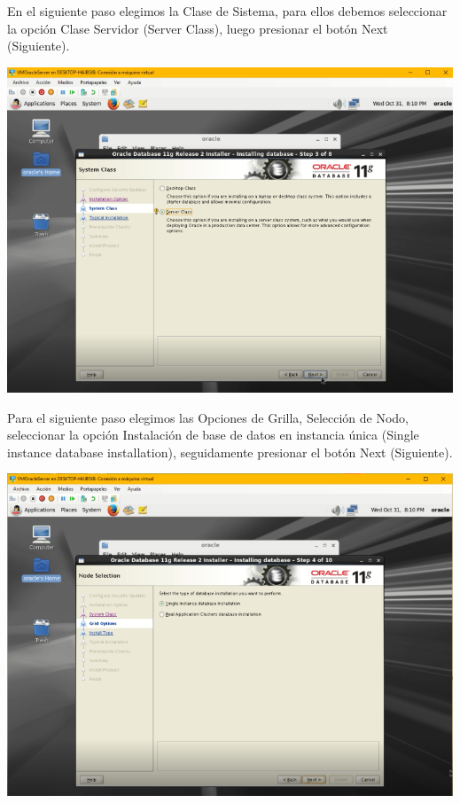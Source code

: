 \vspace{\baselineskip}

En el siguiente paso elegimos la Clase de Sistema, para ellos debemos seleccionar la opción Clase Servidor (Server Class), luego presionar el botón Next (Siguiente).
\begin{center}
	\includegraphics[width=13.3cm]{./Imagenes/73} 
\end{center}

\vspace{\baselineskip}

Para el siguiente paso elegimos las Opciones de Grilla, Selección de Nodo, seleccionar la opción Instalación de base de datos en instancia única (Single instance database installation), seguidamente presionar el botón Next (Siguiente).
\begin{center}
	\includegraphics[width=13.3cm]{./Imagenes/74} 
\end{center}

